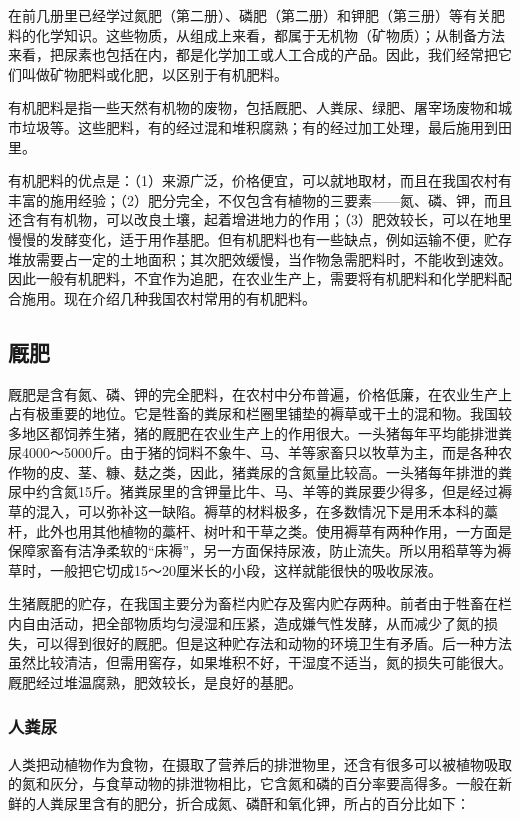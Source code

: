 在前几册里已经学过氮肥（第二册）、磷肥（第二册）和钾肥（第三册）等有关肥料的化学知识。这些物质，从组成上来看，都属于无机物（矿物质）；从制备方法来看，把尿素也包括在内，都是化学加工或人工合成的产品。因此，我们经常把它们叫做矿物肥料或化肥，以区别于有机肥料。

有机肥料是指一些天然有机物的废物，包括厩肥、人粪尿、绿肥、屠宰场废物和城市垃圾等。这些肥料，有的经过混和堆积腐熟；有的经过加工处理，最后施用到田里。

有机肥料的优点是：（1）来源广泛，价格便宜，可以就地取材，而且在我国农村有丰富的施用经验；（2）肥分完全，不仅包含有植物的三要素------氮、磷、钾，而且还含有有机物，可以改良土壤，起着增进地力的作用；（3）肥效较长，可以在地里慢慢的发酵变化，适于用作基肥。但有机肥料也有一些缺点，例如运输不便，贮存堆放需要占一定的土地面积；其次肥效缓慢，当作物急需肥料时，不能收到速效。因此一般有机肥料，不宜作为追肥，在农业生产上，需要将有机肥料和化学肥料配合施用。现在介绍几种我国农村常用的有机肥料。

\subsection{厩肥}

厩肥是含有氮、磷、钾的完全肥料，在农村中分布普遍，价格低廉，在农业生产上占有极重要的地位。它是牲畜的粪尿和栏圈里铺垫的褥草或干土的混和物。我国较多地区都饲养生猪，猪的厩肥在农业生产上的作用很大。一头猪每年平均能排泄粪尿4000～5000斤。由于猪的饲料不象牛、马、羊等家畜只以牧草为主，而是各种农作物的皮、茎、糠、麸之类，因此，猪粪尿的含氮量比较高。一头猪每年排泄的粪尿中约含氮15斤。猪粪尿里的含钾量比牛、马、羊等的粪尿要少得多，但是经过褥草的混入，可以弥补这一缺陷。褥草的材料极多，在多数情况下是用禾本科的藁杆，此外也用其他植物的藁杆、树叶和干草之类。使用褥草有两种作用，一方面是保障家畜有洁净柔软的``床褥''，另一方面保持尿液，防止流失。所以用稻草等为褥草时，一般把它切成15～20厘米长的小段，这样就能很快的吸收尿液。

生猪厩肥的贮存，在我国主要分为畜栏内贮存及窖内贮存两种。前者由于牲畜在栏内自由活动，把全部物质均匀浸湿和压紧，造成嫌气性发酵，从而减少了氮的损失，可以得到很好的厩肥。但是这种贮存法和动物的环境卫生有矛盾。后一种方法虽然比较清洁，但需用窖存，如果堆积不好，干湿度不适当，氮的损失可能很大。厩肥经过堆温腐熟，肥效较长，是良好的基肥。

\subsubsection{人粪尿}

人类把动植物作为食物，在摄取了营养后的排泄物里，还含有很多可以被植物吸取的氮和灰分，与食草动物的排泄物相比，它含氮和磷的百分率要高得多。一般在新鲜的人粪尿里含有的肥分，折合成氮、磷酐和氧化钾，所占的百分比如下：

